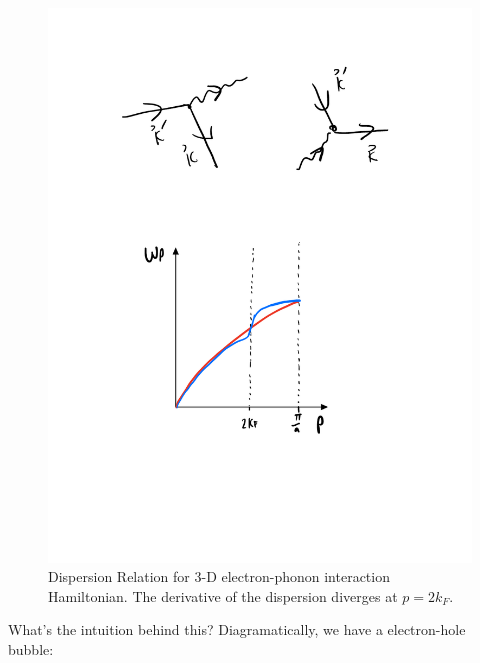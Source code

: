 \begin{figure}[htbp]
    \centering
    \includegraphics[scale=0.6]{Images/fig-kohndispersion.pdf}
    \caption{Dispersion Relation for 3-D electron-phonon interaction Hamiltonian. The derivative of the dispersion diverges at $p = 2k_F$.}
    \label{fig-kohndispersion}
\end{figure}

What's the intuition behind this? Diagramatically, we have a electron-hole bubble:

